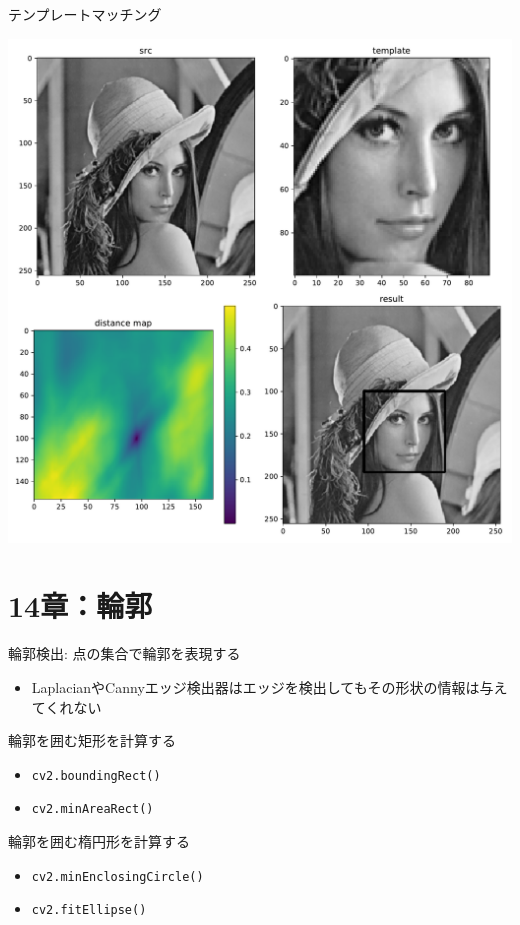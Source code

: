 \documentclass[10pt]{beamer}
\begin{document}
	\begin{frame}{テンプレートマッチング}
	    \begin{center}
	        \includegraphics[width=0.7\hsize]{figs/template_matching.pdf}
	    \end{center}
	\end{frame}
	
	\section{14章：輪郭}
	
	\begin{frame}{輪郭検出: 点の集合で輪郭を表現する}
	    \begin{itemize}
	        \item LaplacianやCannyエッジ検出器はエッジを検出してもその形状の情報は与えてくれない
	    \end{itemize}
	\end{frame}
	
	\begin{frame}{輪郭を囲む矩形を計算する}
	    \begin{itemize}
	        \item \texttt{cv2.boundingRect()}
	        \item \texttt{cv2.minAreaRect()}
	    \end{itemize}
	\end{frame}
	
	\begin{frame}{輪郭を囲む楕円形を計算する}
	    \begin{itemize}
	        \item \texttt{cv2.minEnclosingCircle()}
	        \item \texttt{cv2.fitEllipse()}
	    \end{itemize}
	\end{frame}
	
\end{document}
